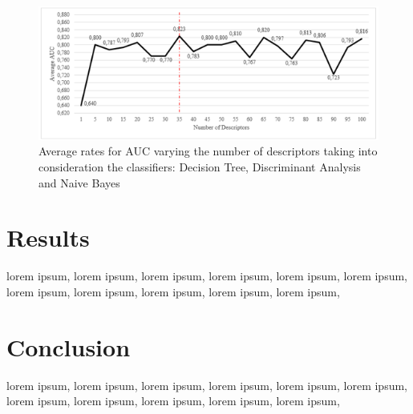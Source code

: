 \documentclass[conference]{IEEEtran}
\begin{document}
\begin{figure}[h]
    \centering
    \includegraphics[width=18.3cm]{images/chart.png}
    \caption{Average rates for AUC varying the number of descriptors taking into consideration the classifiers: Decision Tree, Discriminant Analysis and Naive Bayes}
    \label{fig:my_label}
\end{figure}{}

\section{Results}

lorem ipsum, lorem ipsum, lorem ipsum, lorem ipsum, lorem ipsum, lorem ipsum, lorem ipsum, lorem ipsum, lorem ipsum, lorem ipsum, lorem ipsum, 

\section{Conclusion}
lorem ipsum, lorem ipsum, lorem ipsum, lorem ipsum, lorem ipsum, lorem ipsum, lorem ipsum, lorem ipsum, lorem ipsum, lorem ipsum, lorem ipsum, 



\end{document}
